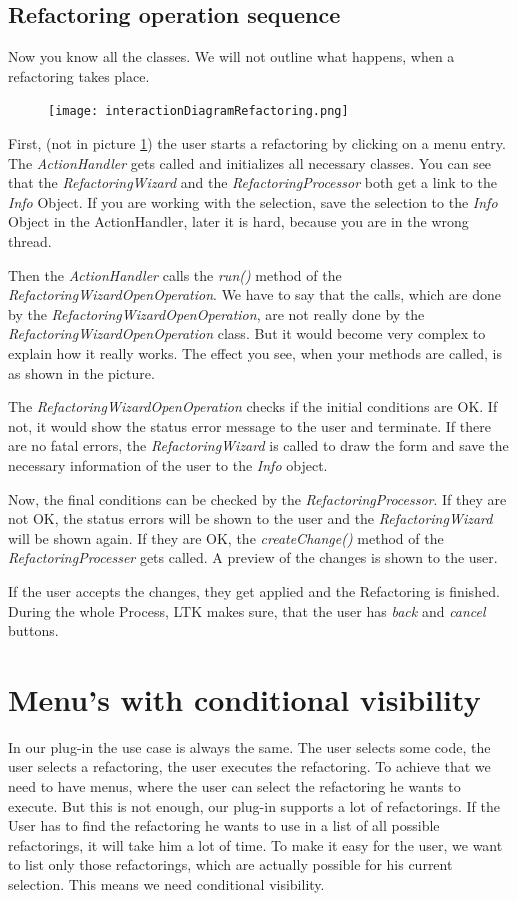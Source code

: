 \documentclass[a4paper,10pt]{report}
\begin{document}
\section{Refactoring operation sequence}
\label{refactoringOperationSequence}
Now you know all the classes. We will not outline what happens, when a refactoring takes place. 
\begin{figure}[h]
\centering
\texttt{[image: interactionDiagramRefactoring.png]}
\label{ interactionDiagramRefactoring }
\end{figure}
First, (not in picture \ref{ interactionDiagramRefactoring }) the user starts a refactoring by clicking on a menu entry.
The {\it ActionHandler} gets called and initializes all necessary classes.
You can see that the {\it RefactoringWizard} and the {\it RefactoringProcessor} both get a link to the {\it Info} Object.
If you are working with the selection, save the selection to the {\it Info} Object in the ActionHandler, later it is hard, because you are in the wrong thread.

Then the {\it ActionHandler} calls the {\it run()} method of the {\it RefactoringWizardOpenOperation}.
We have to say that the calls, which are done by the {\it RefactoringWizardOpenOperation}, are not really done by the {\it RefactoringWizardOpenOperation} class.
But it would become very complex to explain how it really works. The effect you see, when your methods are called, is as shown in the picture.

The {\it RefactoringWizardOpenOperation} checks if the initial conditions are OK.
If not, it would show the status error message to the user and terminate. 
If there are no fatal errors, the {\it RefactoringWizard} is called to draw the form and save the necessary information of the user to the {\it Info} object.

Now, the final conditions can be checked by the {\it RefactoringProcessor}.
If they are not OK, the status errors will be shown to the user and the {\it RefactoringWizard} will be shown again.
If they are OK, the {\it createChange()} method of the {\it RefactoringProcesser} gets called. A preview of the changes is shown to the user.

If the user accepts the changes, they get applied and the Refactoring is finished.
During the whole Process, LTK makes sure, that the user has {\it back} and {\it cancel} buttons.

\chapter{Menu's with conditional visibility}
\label{menuWithConditionalVisibility}
In our plug-in the use case is always the same. The user selects some code, the user selects a refactoring, the user executes the refactoring.
To achieve that we need to have menus, where the user can select the refactoring he wants to execute.
But this is not enough, our plug-in supports a lot of refactorings.
If the User has to find the refactoring he wants to use in a list of all possible refactorings, it will take him a lot of time.
To make it easy for the user, we want to list only those refactorings, which are actually possible for his current selection.
This means we need conditional visibility.
\end{document}
